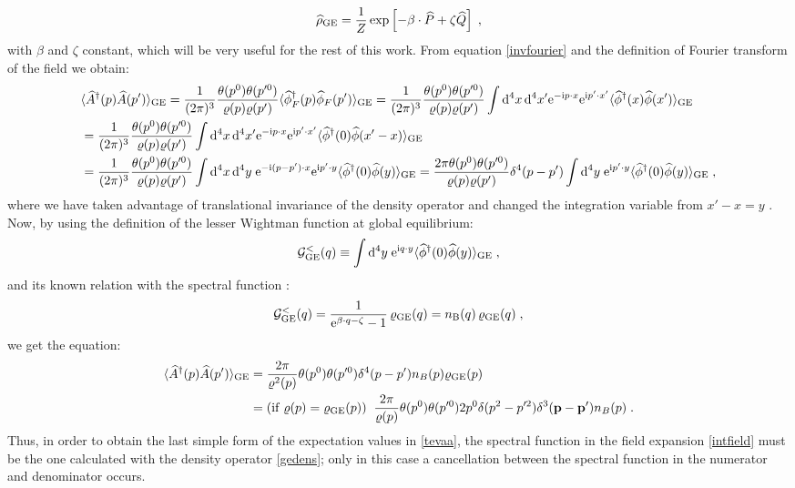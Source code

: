 \documentclass[prd,superscriptaddress,nofootinbib,notitlepage]{revtex4-1}
\def\wP{{\widehat P}}
\def\wA{{\widehat A}}
\def\wQ{{\widehat Q}}
\def\wrho{{\widehat{\rho}}}
\def\wA{\widehat A}
\def\wAd{\widehat A^{\dagger}}
\def\wQ{\widehat Q}
\def\wphi{\widehat \phi}
\newcommand{\e}{{\rm e}}
\newcommand{\di}{{\rm d}}
\newcommand{\ii}{{\rm i}}
\newcommand{\p}{{\mathbf{p}}}
\newcommand{\be}{\begin{equation}}
\newcommand{\ee}{\end{equation}}
\begin{document}
%
\be\label{gedens}
\wrho_{\rm GE}= \frac{1}{Z}\exp\left[-\beta \cdot \wP + \zeta \wQ\right]\;,
\ee
%
with $\beta$ and $\zeta$ constant, which will be very useful for the rest of this work. 
From equation \eqref{invfourier} and the definition of Fourier transform of the field we obtain:
%
\begin{align*}
& \langle \wAd(p)\wA(p')\rangle_{\rm GE} = \frac{1}{(2\pi)^3} \frac{\theta(p^0)\theta(p'^0)}{\varrho(p)\varrho(p')} \langle 
\wphi^\dagger_F(p)\wphi_F(p')\rangle_{\rm GE} = \frac{1}{(2\pi)^3} \frac{\theta(p^0)\theta(p'^0)}{\varrho(p)\varrho(p')}
 \int \di^4 x \, \di^4 x' \e^{-\ii p \cdot x} \e^{\ii p' \cdot x'} \langle \wphi^\dagger(x)\wphi(x')
 \rangle_{\rm GE} \\
& = \frac{1}{(2\pi)^3} \frac{\theta(p^0)\theta(p'^0)}{\varrho(p)\varrho(p')}
 \int \di^4 x \, \di^4 x' \e^{-\ii p \cdot x} \e^{\ii p' \cdot x'} \langle \wphi^\dagger(0)\wphi(x'-x)\rangle_{\rm GE}\\
 &
 = \frac{1}{(2\pi)^3} \frac{\theta(p^0)\theta(p'^0)}{\varrho(p)\varrho(p')}
 \int \di^4 x \, \di^4 y \; \e^{-\ii (p-p') \cdot x} \e^{\ii p' \cdot y} \langle \wphi^\dagger(0)\wphi(y) \rangle_{\rm GE}=\frac{2\pi\theta(p^0)\theta(p'^0)}{\varrho(p)\varrho(p')} \delta^4(p-p') \int \di^4 y \; \e^{\ii p' \cdot y} \langle \wphi^\dagger(0)\wphi(y) \rangle_{\rm GE}\;,
 \end{align*}
%
where we have taken advantage of translational invariance of the density operator and changed the integration
variable from $x'-x=y$ . Now, by using the definition of the lesser Wightman function at global equilibrium:
%
$$
 {\cal G}^<_{\rm GE}(q) \equiv \int \di^4 y \; \e^{\ii q \cdot y} \langle \wphi^\dagger(0)\wphi(y) \rangle_{\rm GE}\;,
$$
%
and its known relation with the spectral function \cite{LeBellac_1996}:
%
$$
 {\cal G}^<_{\rm GE}(q) = \frac{1}{\e^{\beta \cdot q - \zeta}-1}\, \varrho_{\rm GE}(q) = n_{\rm B}(q)\, \varrho_{\rm GE}(q)\;,
$$
%
we get the equation:
%
\begin{align}\label{tevaa}
\langle \wAd(p)\wA(p')\rangle_{\rm GE} & = \frac{2\pi}{\varrho^2(p)} \theta(p^0)\theta(p'^0)
\delta^4(p-p') n_B(p) \varrho_{\rm GE}(p) \nonumber \\
& = ({\rm if}\; \varrho(p) = \varrho_{\rm GE}(p)) \;\; 
\frac{2\pi}{\varrho(p)} \theta(p^0)\theta(p'^0) 2p^0 \delta(p^2-p'^2) \delta^3(\p-\p') n_B(p)\;.
\end{align}
%
Thus, in order to obtain the last simple form of the expectation values in \eqref{tevaa}, the spectral function 
in the field expansion \eqref{intfield} must be the one calculated with the density operator \eqref{gedens}; 
only in this case a cancellation between the spectral function in the numerator and denominator occurs. 
\end{document}
